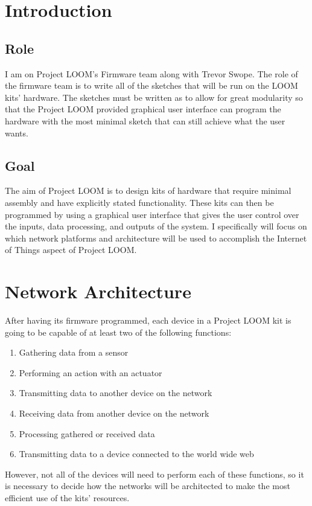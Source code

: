 \documentclass[onecolumn, draftclsnofoot,10pt, compsoc]{IEEEtran}
\begin{document}
\section{Introduction}
	\subsection{Role}
	I am on Project LOOM's Firmware team along with Trevor Swope. The role of the firmware
	team is to write all of the sketches that will be run on the LOOM kits' hardware. The
	sketches must be written as to allow for great modularity so that the Project LOOM
	provided graphical user interface can program the hardware with the most minimal sketch
	that can still achieve what the user wants.
	
	\subsection{Goal}
	The aim of Project LOOM is to design kits of hardware that require minimal assembly
	and have explicitly stated functionality. These kits can then be programmed by using 
	a graphical user interface that gives the user control over the inputs, data processing,
	and outputs of the system. I specifically will focus on which network platforms and 
	architecture will be used to accomplish the Internet of Things aspect of Project LOOM.

\section{Network Architecture}
	After having its firmware programmed, each device in a Project LOOM kit is going to be 
	capable of at least two of the following functions:
	\begin{enumerate}
		\item Gathering data from a sensor
		\item Performing an action with an actuator
		\item Transmitting data to another device on the network
		\item Receiving data from another device on the network
		\item Processing gathered or received data
		\item Transmitting data to a device connected to the world wide web
	\end{enumerate}
	However, not all of the devices will need to perform each of these functions, so it is
	necessary to decide how the networks will be architected to make the most efficient
	use of the kits' resources.
\end{document}
